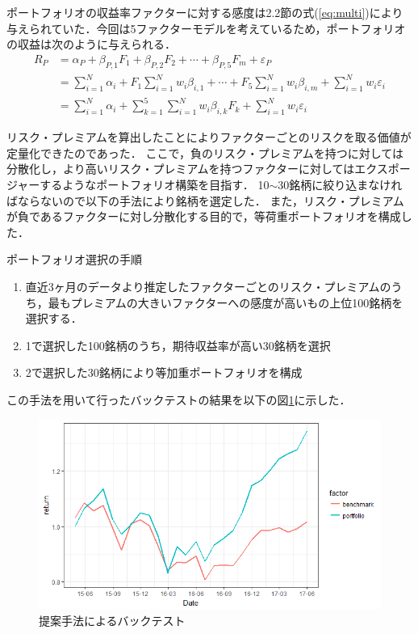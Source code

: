 ﻿\documentclass[a4paper]{jarticle}
\begin{document}
ポートフォリオの収益率ファクターに対する感度は2.2節の式(\ref{eq:multi})により与えられていた．今回は5ファクターモデルを考えているため，ポートフォリオの収益は次のように与えられる．
\begin{equation}
\begin{split}
R_P &= \alpha_P + \beta_{P,1} F_1 + \beta_{P,2} F_2 + \cdots + \beta_{P,5} F_m + \varepsilon_P\\
&=\sum_{i=1}^N \alpha_i + F_1 \sum_{i=1}^N w_i \beta_{i,1} + \cdots + F_5 \sum_{i=1}^N w_i \beta_{i,m} + \sum_{i=1}^N w_i\varepsilon_i\\
&= \sum_{i=1}^N \alpha_i + \sum_{k=1}^5 \sum_{i=1}^N w_i \beta_{i,k} F_k + \sum_{i=1}^N w_i\varepsilon_i
\label{eq:port}
\end{split}
\end{equation}

リスク・プレミアムを算出したことによりファクターごとのリスクを取る価値が定量化できたのであった．
ここで，負のリスク・プレミアムを持つに対しては分散化し，より高いリスク・プレミアムを持つファクターに対してはエクスポージャーするようなポートフォリオ構築を目指す．
10$\sim$30銘柄に絞り込まなければならないので以下の手法により銘柄を選定した．
また，リスク・プレミアムが負であるファクターに対し分散化する目的で，等荷重ポートフォリオを構成した．

\begin{itembox}[l]{ポートフォリオ選択の手順}
\begin{enumerate}
\item 直近3ヶ月のデータより推定したファクターごとのリスク・プレミアムのうち，最もプレミアムの大きいファクターへの感度が高いもの上位100銘柄を選択する．
\item 1で選択した100銘柄のうち，期待収益率が高い30銘柄を選択
\item 2で選択した30銘柄により等加重ポートフォリオを構成
\end{enumerate}
\end{itembox}

この手法を用いて行ったバックテストの結果を以下の図\ref{fig:teiann}に示した．

\begin{figure}[H]
	\begin{center}
		\includegraphics[width=15cm]{./fig/teiann.png}
		\caption{提案手法によるバックテスト}
		\label{fig:teiann}
	\end{center}
\end{figure}
\end{document}
